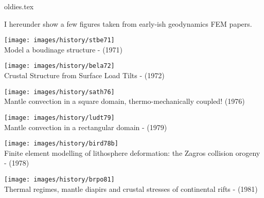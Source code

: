\begin{flushright} {\tiny {\color{gray} oldies.tex}} \end{flushright}

I hereunder show a few figures taken from early-ish geodynamics FEM papers.


\begin{center}
\begin{minipage}{0.45\textwidth}
\centering
\texttt{[image: images/history/stbe71]}\\
{\captionfont Model a boudinage structure - \textcite{stbe71} (1971)}
\end{minipage}\hfill
\begin{minipage}{0.45\textwidth}
\centering
\texttt{[image: images/history/bela72]}\\
{\captionfont Crustal Structure from Surface Load Tilts - \textcite{bela72} (1972)}
\end{minipage}
\end{center}


\begin{center}
\texttt{[image: images/history/sath76]}\\
{\captionfont Mantle convection in a square domain, thermo-mechanically coupled! \textcite{sath76} (1976)}
\end{center}

\begin{center}
\texttt{[image: images/history/ludt79]}\\
{\captionfont Mantle convection in a rectangular domain - \textcite{ludt79} (1979)}
\end{center}


\begin{center}
\begin{minipage}{0.45\textwidth}
\centering
\texttt{[image: images/history/bird78b]}\\
{\captionfont Finite element modelling of lithosphere deformation: the Zagros collision 
orogeny - \textcite{bird78b} (1978)}
\end{minipage}\hfill
\begin{minipage}{0.45\textwidth}
\centering
\texttt{[image: images/history/brpo81]}\\
{\captionfont Thermal regimes, mantle diapirs and crustal stresses of 
continental rifts - \textcite{brpo81} (1981)}
\end{minipage}
\end{center}

